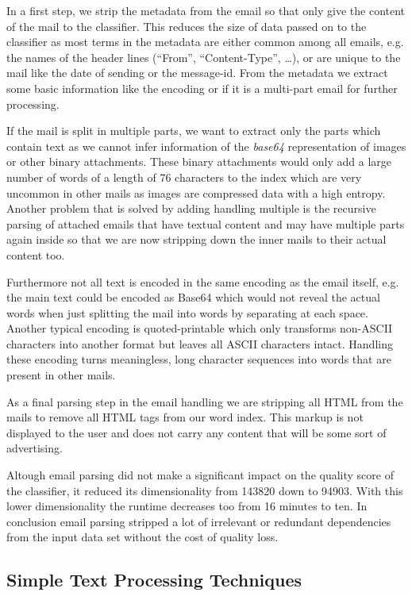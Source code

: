 In a first step, we strip the metadata from the email so that only give the content of the mail to the classifier.
This reduces the size of data passed on to the classifier as most terms in the metadata are either common among all emails, e.g. the names of the header lines (``From'', ``Content-Type'', \dots), or are unique to the mail like the date of sending or the message-id.
From the metadata we extract some basic information like the encoding or if it is a multi-part email for further processing.

If the mail is split in multiple parts, we want to extract only the parts which contain text as we cannot infer information of the \emph{base64} representation of images or other binary attachments.
These binary attachments would only add a large number of words of a length of 76 characters \cite{rfc2045} to the index which are very uncommon in other mails as images are compressed data with a high entropy.
Another problem that is solved by adding handling multiple is the recursive parsing of attached emails that have textual content and may have multiple parts again inside so that we are now stripping down the inner mails to their actual content too.

Furthermore not all text is encoded in the same encoding as the email itself, e.g. the main text could be encoded as Base64 which would not reveal the actual words when just splitting the mail into words by separating at each space.
Another typical encoding is quoted-printable which only transforms non-ASCII characters into another format but leaves all ASCII characters intact.
Handling these encoding turns meaningless, long character sequences into words that are present in other mails.

As a final parsing step in the email handling we are stripping all HTML from the mails to remove all HTML tags from our word index.
This markup is not displayed to the user and does not carry any content that will be some sort of advertising.

Altough email parsing did not make a significant impact on the quality score of the classifier, it reduced its dimensionality from 143820 down to 94903.
With this lower dimensionality the runtime decreases too from 16 minutes to ten.
In conclusion email parsing stripped a lot of irrelevant or redundant dependencies from the input data set without the cost of quality loss.

\subsection{Simple Text Processing Techniques}

